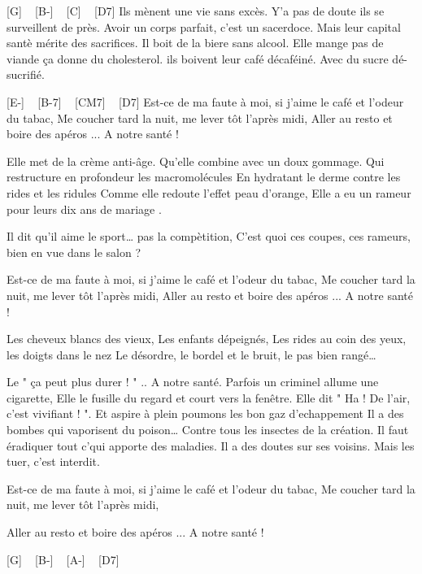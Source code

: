 [G] ~ [B-] ~ [C] ~ [D7]
Ils mènent une vie sans excès.
Y'a pas de doute ils se surveillent de près.
Avoir un corps parfait, c'est un sacerdoce.
Mais leur capital santè mérite des sacrifices.
Il boit de la biere sans alcool.
Elle mange pas de viande ça donne du cholesterol.
ils boivent leur café décaféiné.
Avec du sucre dé-sucrifié.

[E-] ~ [B-7] ~ [CM7] ~ [D7]
Est-ce de ma faute à moi, si j'aime le café et l'odeur du tabac,
Me coucher tard la nuit, me lever tôt l'après midi,
Aller au resto et boire des apéros
... A notre santé !

Elle met de la crème anti-âge.
Qu'elle combine avec un doux gommage.
Qui restructure en profondeur les macromolécules
En hydratant le derme contre les rides et les ridules
Comme elle redoute l'effet peau d'orange,
Elle a eu un rameur pour leurs dix ans de mariage .

Il dit qu'il aime le sport… pas la compètition,
C'est quoi ces coupes, ces rameurs, bien en vue dans le salon ?

Est-ce de ma faute à moi, si j'aime le café et l'odeur du tabac,
Me coucher tard la nuit, me lever tôt l'après midi,
Aller au resto et boire des apéros
... A notre santé !

Les cheveux blancs des vieux, Les enfants dépeignés,
Les rides au coin des yeux, les doigts dans le nez
Le désordre, le bordel et le bruit, le pas bien rangé…

Le " ça peut plus durer ! "
.. A notre santé.
Parfois un criminel allume une cigarette,
Elle le fusille du regard et court vers la fenêtre.
Elle dit " Ha ! De l'air, c'est vivifiant ! ".
Et aspire à plein poumons les bon gaz d'echappement
Il a des bombes qui vaporisent du poison…
Contre tous les insectes de la création.
Il faut éradiquer tout c'qui apporte des maladies.
Il a des doutes sur ses voisins. Mais les tuer, c'est interdit.

Est-ce de ma faute à moi, si j'aime le café et l'odeur du tabac,
Me coucher tard la nuit, me lever tôt l'après midi,

Aller au resto et boire des apéros
... A notre santé ! 

[G] ~ [B-] ~ [A-] ~ [D7]